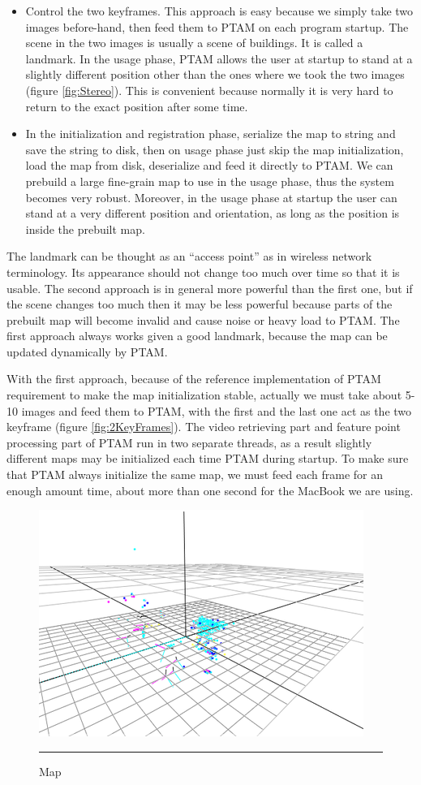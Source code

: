 \begin{itemize}
	\item Control the two keyframes. This approach is easy because we simply take two images before-hand, then feed them to PTAM on each program startup. The scene in the two images is usually a scene of buildings. It is called a landmark. In the usage phase, PTAM allows the user at startup to stand at a slightly different position other than the ones where we took the two images (figure \ref{fig:Stereo}). This is convenient because normally it is very hard to return to the exact position after some time.
	\item In the initialization and registration phase, serialize the map to string and save the string to disk, then on usage phase just skip the map initialization, load the map from disk, deserialize and feed it directly to PTAM. We can prebuild a large fine-grain map to use in the usage phase, thus the system becomes very robust. Moreover, in the usage phase at startup the user can stand at a very different position and orientation, as long as the position is inside the prebuilt map.
\end{itemize}

The landmark can be thought as an ``access point'' as in wireless network terminology. Its appearance should not change too much over time so that it is usable. The second approach is in general more powerful than the first one, but if the scene changes too much then it may be less powerful because parts of the prebuilt map will become invalid and cause noise or heavy load to PTAM. The first approach always works given a good landmark, because the map can be updated dynamically by PTAM.

With the first approach, because of the reference implementation of PTAM requirement to make the map initialization stable, actually we must take about 5-10 images and feed them to PTAM, with the first and the last one act as the two keyframe (figure \ref{fig:2KeyFrames}). The video retrieving part and feature point processing part of PTAM run in two separate threads, as a result slightly different maps may be initialized each time PTAM during startup. To make sure that PTAM always initialize the same map, we must feed each frame for an enough amount time, about more than one second for the MacBook we are using.

\begin{figure}[htbp]
	\centering
	\includegraphics{./Primitives/map.png}
	\rule{35em}{0.5pt}
	\caption[Map]{Map}
	\label{fig:Map}
\end{figure}

